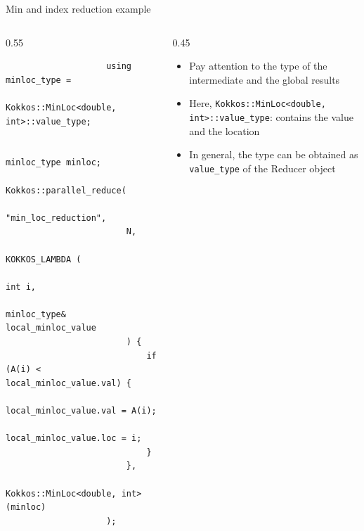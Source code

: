 \documentclass[
    aspectratio=169,
    \createHandout
]{beamer}
\begin{document}

\begin{frame}[fragile]{Min and index reduction example}
    \begin{columns}
        \begin{column}{0.55\linewidth}
            \begin{verbatim}
                    using minloc_type =
                        Kokkos::MinLoc<double, int>::value_type;

                    minloc_type minloc;
                    Kokkos::parallel_reduce(
                        "min_loc_reduction",
                        N,
                        KOKKOS_LAMBDA (
                            int i,
                            minloc_type& local_minloc_value
                        ) {
                            if (A(i) < local_minloc_value.val) {
                                local_minloc_value.val = A(i);
                                local_minloc_value.loc = i;
                            }
                        },
                        Kokkos::MinLoc<double, int>(minloc)
                    );
                \end{verbatim}
        \end{column}
        \begin{column}{0.45\linewidth}
            \begin{itemize}
                \item Pay attention to the type of the intermediate and the global results
                \item Here, \texttt{Kokkos::MinLoc<double, int>::value\_type}: contains the value and the location
                \item In general, the type can be obtained as \texttt{value\_type} of the Reducer object
            \end{itemize}
        \end{column}
    \end{columns}
\end{frame}

\end{document}
